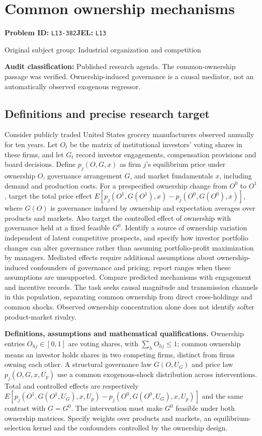 \documentclass[11pt,a4paper]{article}
\begin{document}
\section*{Common ownership mechanisms}
\textbf{Problem ID:} \texttt{L13-382}\quad \textbf{JEL:} \texttt{L13}\par
\label{problem:OP-0397}
{\sffamily\small\color{muted}Original subject group: Industrial organization and competition\par}
\label{definitions:problem:30007679}
\textbf{Audit classification:} Published research agenda. The common-ownership passage was verified. Ownership-induced governance is a causal mediator, not an automatically observed exogenous regressor.
\subsection*{Definitions and precise research target}
Consider publicly traded United States grocery manufacturers observed annually for ten years. Let \(O_t\) be the matrix of institutional investors' voting shares in these firms, and let \(G_t\) record investor engagements, compensation provisions and board decisions. Define \(p_j(O,G,x)\) as firm \(j\)'s equilibrium price under ownership \(O\), governance arrangement \(G\), and market fundamentals \(x\), including demand and production costs. For a prespecified ownership change from \(O^0\) to \(O^1\), target the total price effect \(E[p_j(O^1,G(O^1),x)-p_j(O^0,G(O^0),x)]\), where \(G(O)\) is governance induced by ownership and expectation averages over products and markets. Also target the controlled effect of ownership with governance held at a fixed feasible \(G^0\). Identify a source of ownership variation independent of latent competitive prospects, and specify how investor portfolio changes can alter governance rather than assuming portfolio-profit maximization by managers. Mediated effects require additional assumptions about ownership-induced confounders of governance and pricing; report ranges when these assumptions are unsupported. Compare predicted mechanisms with engagement and incentive records. The task seeks causal magnitude and transmission channels in this population, separating common ownership from direct cross-holdings and common shocks. Observed ownership concentration alone does not identify softer product-market rivalry.

\textbf{Definitions, assumptions and mathematical qualifications.} Ownership entries \(O_{hj}\in[0,1]\) are voting shares, with \(\sum_hO_{hj}\leq1\); common ownership means an investor holds shares in two competing firms, distinct from firms owning each other. A structural governance law \(G(O,U_G)\) and price law \(p_j(O,G,x,U_p)\) use a common exogenous-shock distribution across interventions. Total and controlled effects are respectively \(E[p_j(O^1,G(O^1,U_G),x,U_p)-p_j(O^0,G(O^0,U_G),x,U_p)]\) and the same contrast with \(G=G^0\). The intervention must make \(G^0\) feasible under both ownership matrices. Specify weights over products and markets, an equilibrium-selection kernel and the confounders controlled by the ownership design.
\end{document}
